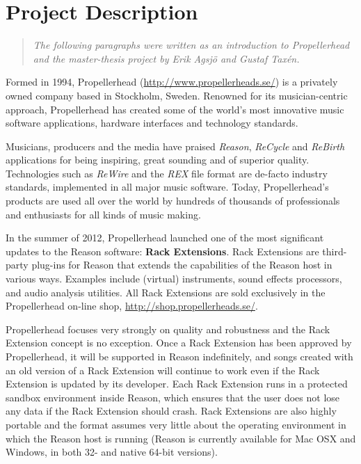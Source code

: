 \chapter* {Project Description}

\begin {quote}
    \emph {The following paragraphs were written as an introduction to
           Propellerhead and the master-thesis project by Erik Agsjö and Gustaf
           Taxén.}
\end {quote}

Formed in 1994, Propellerhead (\url {http://www.propellerheads.se/}) is a
privately owned company based in Stockholm, Sweden. Renowned for its
musician-centric approach, Propellerhead has created some of the world's most
innovative music software applications, hardware interfaces and technology
standards.

Musicians, producers and the media have praised \emph {Reason}, \emph {ReCycle}
and \emph {ReBirth} applications for being inspiring, great sounding and of
superior quality. Technologies such as \emph {ReWire} and the \emph {REX} file
format are de-facto industry standards, implemented in all major music software.
Today, Propellerhead’s products are used all over the world by hundreds of
thousands of professionals and enthusiasts for all kinds of music making.

In the summer of 2012, Propellerhead launched one of the most significant
updates to the Reason software: \textbf {Rack Extensions}. Rack Extensions are
third-party plug-ins for Reason that extends the capabilities of the Reason host
in various ways. Examples include (virtual) instruments, sound effects
processors, and audio analysis utilities. All Rack Extensions are sold
exclusively in the Propellerhead on-line shop,
\url {http://shop.propellerheads.se/}.

Propellerhead focuses very strongly on quality and robustness and the Rack
Extension concept is no exception. Once a Rack Extension has been approved by
Propellerhead, it will be supported in Reason indefinitely, and songs created
with an old version of a Rack Extension will continue to work even if the Rack
Extension is updated by its developer. Each Rack Extension runs in a protected
sandbox environment inside Reason, which ensures that the user does not lose any
data if the Rack Extension should crash. Rack Extensions are also highly
portable and the format assumes very little about the operating environment in
which the Reason host is running (Reason is currently available for Mac OSX and
Windows, in both 32- and native 64-bit versions).

